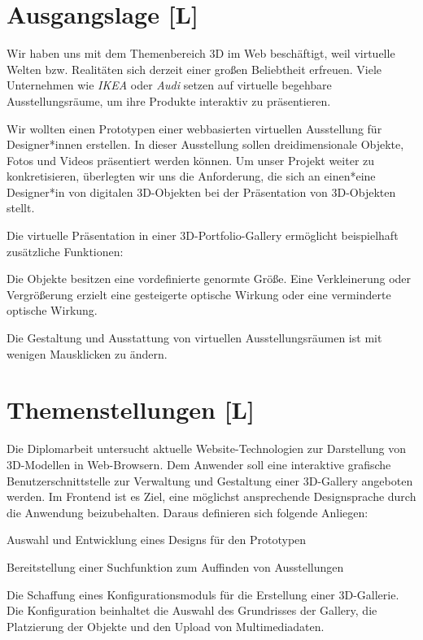 \section{Ausgangslage [L]}
Wir haben uns mit dem Themenbereich 3D im Web beschäftigt, weil virtuelle Welten bzw. Realitäten sich derzeit einer großen Beliebtheit erfreuen. Viele Unternehmen wie \emph{IKEA} oder \emph{Audi} setzen auf virtuelle begehbare Ausstellungsräume, um ihre Produkte interaktiv zu präsentieren. \cite{VrVW}

Wir wollten einen Prototypen einer webbasierten virtuellen Ausstellung für Designer*innen erstellen. In dieser Ausstellung sollen dreidimensionale Objekte, Fotos und Videos präsentiert werden können. Um unser Projekt weiter zu konkretisieren, überlegten wir uns die Anforderung, die sich an einen*eine Designer*in von digitalen 3D-Objekten bei der Präsentation von 3D-Objekten stellt.

Die virtuelle Präsentation in einer 3D-Portfolio-Gallery ermöglicht beispielhaft zusätzliche Funktionen:
\begin{compactitem}
    \item Die Objekte besitzen eine vordefinierte genormte Größe. Eine Verkleinerung oder Vergrößerung erzielt eine gesteigerte optische Wirkung oder eine verminderte optische Wirkung.
    \item Die Gestaltung und Ausstattung von virtuellen Ausstellungsräumen ist mit wenigen Mausklicken zu ändern.
\end{compactitem}


\section{Themenstellungen [L]}
Die Diplomarbeit untersucht aktuelle Website-Technologien zur Darstellung von 3D-Modellen in Web-Browsern.
Dem Anwender soll eine interaktive grafische Benutzerschnittstelle zur Verwaltung und Gestaltung einer 3D-Gallery angeboten werden.
Im Frontend ist es Ziel, eine möglichst ansprechende Designsprache durch die Anwendung beizubehalten.
Daraus definieren sich folgende Anliegen:
\begin{compactitem}
    \item Auswahl und Entwicklung eines Designs für den Prototypen
    \item Bereitstellung einer Suchfunktion zum Auffinden von Ausstellungen
    \item Die Schaffung eines Konfigurationsmoduls für die Erstellung einer 3D-Gallerie. Die Konfiguration beinhaltet die Auswahl des Grundrisses der Gallery, die Platzierung der Objekte und den Upload von Multimediadaten.
\end{compactitem}


